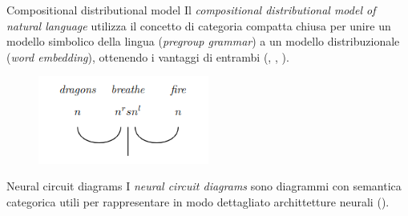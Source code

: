\documentclass{beamer}
\begin{document}
\begin{frame}{Compositional distributional model}
    Il \textit{compositional distributional model of natural language} utilizza il concetto di categoria compatta chiusa per unire un modello simbolico della lingua (\textit{pregroup grammar}) a un modello distribuzionale (\textit{word embedding}), ottenendo i vantaggi di entrambi (\cite{clark2007combining}, \cite{coecke2010mathematical}, \cite{lewis2019compositionality}).

    \begin{figure}
        \begin{center}
            \includegraphics[width=0.5\textwidth]{figures/pregroup1.png}
            \caption*{\cite{lewis2019compositionality}}
        \end{center}
    \end{figure}
\end{frame}

\begin{frame}{Neural circuit diagrams}
    I \textit{neural circuit diagrams} sono diagrammi con semantica categorica utili per rappresentare in modo dettagliato archittetture neurali (\cite{abbott2023robust}).
\end{frame}
\end{document}
